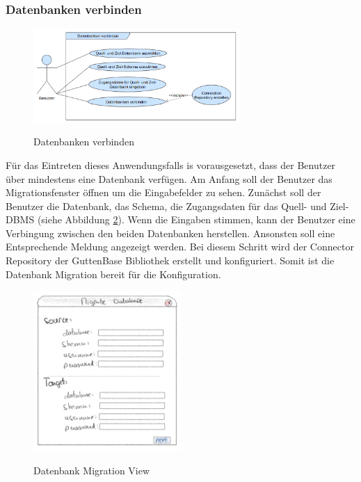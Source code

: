 	\subsubsection*{Datenbanken verbinden}
	\begin{figure}[H]
		\caption{Datenbanken verbinden}
		\centering
		\includegraphics[width=0.7\textwidth]{images/af/af-db-verbinden}
		\label{img:af-db-verbinden}
	\end{figure}
	Für das Eintreten dieses Anwendungsfalls is vorausgesetzt, dass der Benutzer über mindestens eine Datenbank verfügen. Am Anfang soll der Benutzer das Migrationsfenster öffnen um die Eingabefelder zu sehen. Zunächst soll der Benutzer die Datenbank, das Schema, die Zugangsdaten für das Quell- und Ziel-DBMS (siehe Abbildung \ref{img:generalview}).
	Wenn die Eingaben stimmen, kann der Benutzer eine Verbingung zwischen den beiden Datenbanken herstellen. Ansonsten soll eine Entsprechende Meldung angezeigt werden. Bei diesem Schritt wird der Connector Repository der GuttenBase Bibliothek erstellt und konfiguriert. Somit ist die Datenbank Migration bereit für die Konfiguration.
	\begin{figure}[H]
		\caption{Datenbank Migration View}
		\centering
		\includegraphics[width=0.5\textwidth]{images/generalview}
		\label{img:generalview}
	\end{figure}
